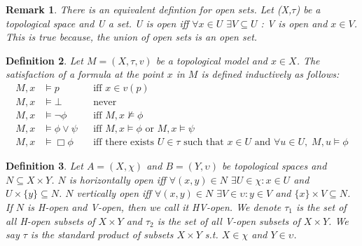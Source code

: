\documentclass[12pt, a4paper]{scrartcl}
\newtheorem{definition}{Definition}[subsection]
\newtheorem{remark}[definition]{Remark}
\begin{document}
\begin{remark}

    There is an equivalent defintion for open sets. Let (X,$\tau$) be a topological space and U a set.
    U is open iff $\forall x \in U$  $\exists V\subseteq U$ : V is open and $x \in V$. This is true because,
    the union of open sets is an open set.
    
\end{remark}


\begin{definition}
Let \( M = (X,\tau,v) \) be a topological model and \( x \in X \).  
The satisfaction of a formula at the point \( x \) in \( M \) is defined inductively as follows:
\[
\begin{aligned}
    M, x &\vDash p &&\text{iff } x \in v(p) \\
    M, x &\vDash \bot &&\text{never} \\
    M, x &\vDash \neg \phi &&\text{iff } M, x \nvDash \phi \\
    M, x &\vDash \phi \lor \psi &&\text{iff } M, x \vDash \phi \text{ or } M, x \vDash \psi \\
    M, x &\vDash \Box \phi &&\text{iff there exists } U \in \tau \text{ such that } x \in U \text{ and } \forall u \in U,\; M, u \vDash \phi
\end{aligned}
\]
\end{definition}




\begin{definition}
    Let $A = (X, \chi)$ and $B =(Y, \upsilon)$ be topological spaces and $N \subseteq X \times Y $. \newline \newline
    $N$ is horizontally open iff  $\forall (x,y) \in N $ $\exists U \in \chi : x \in U $ and $ U \times \{ y \} \subseteq N$. \newline
    $N$ vertically open iff $\forall (x,y) \in N$ $\exists V \in \upsilon : y \in V$ and  $ \{ x \} \times V \subseteq N$. \newline \newline
    If $N$ is H-open and V-open, then we call it HV-open. \newline
    We denote $\tau_1$ is the set of all H-open subsets of $X \times Y$ and $\tau_2$ is the set of all V-open subsets of $X\times Y$. We say $\tau$ is the standard product of subsets $X \times Y$ s.t. $X \in \chi$ and $Y \in \upsilon$.
        
\end{definition}
\end{document}
